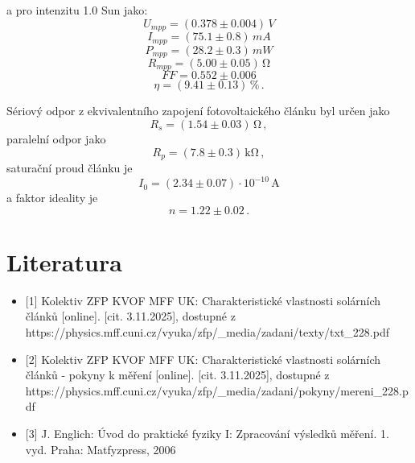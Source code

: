 \documentclass{../concepts/prepareprotokol} %
\begin{document}
a pro intenzitu 1.0 Sun jako:
\begin{equation*}
    U_{mpp} = (0.378 \pm 0.004) \, \si{V}
\end{equation*}
\begin{equation*}
    I_{mpp} = (75.1 \pm 0.8) \, \si{mA}
\end{equation*}
\begin{equation*}
    P_{mpp} = (28.2 \pm 0.3) \, \si{mW}
\end{equation*}
\begin{equation*}
    R_{mpp} = (5.00 \pm 0.05) \, \si{\ohm}
\end{equation*}
\begin{equation*}
    FF = 0.552 \pm 0.006
\end{equation*}
\begin{equation*}
    \eta = (9.41 \pm 0.13)\,\% \, .
\end{equation*}

Sériový odpor z ekvivalentního zapojení fotovoltaického článku byl určen jako
\begin{equation*}
    R_s = (1.54 \pm 0.03) \, \si{\ohm} \, ,
\end{equation*}
paralelní odpor jako
\begin{equation*}
    R_p = (7.8 \pm 0.3) \, \si{\kilo\ohm} \, ,
\end{equation*}
saturační proud článku je
\begin{equation*}
    I_0 = (2.34 \pm 0.07) \cdot 10^{-10} \, \si{\ampere}
\end{equation*}
a faktor ideality je
\begin{equation*}
    n = 1.22 \pm 0.02 \, .
\end{equation*}

\section*{Literatura}
\begin{itemize}
\item 

[1] Kolektiv ZFP KVOF MFF UK: Charakteristické vlastnosti solárních článků [online]. [cit. 3.11.2025], dostupné z https://physics.mff.cuni.cz/vyuka/zfp/\_media/zadani/texty/txt\_228.pdf

\item 

[2] Kolektiv ZFP KVOF MFF UK: Charakteristické vlastnosti solárních článků - pokyny k měření [online]. [cit. 3.11.2025], dostupné z https://physics.mff.cuni.cz/vyuka/zfp/\_media/zadani/pokyny/mereni\_228.pdf

\item 

[3] J. Englich: Úvod do praktické fyziky I: Zpracování výsledků měření. 1. vyd. Praha: Matfyzpress, 2006

\end{itemize}
\end{document}
